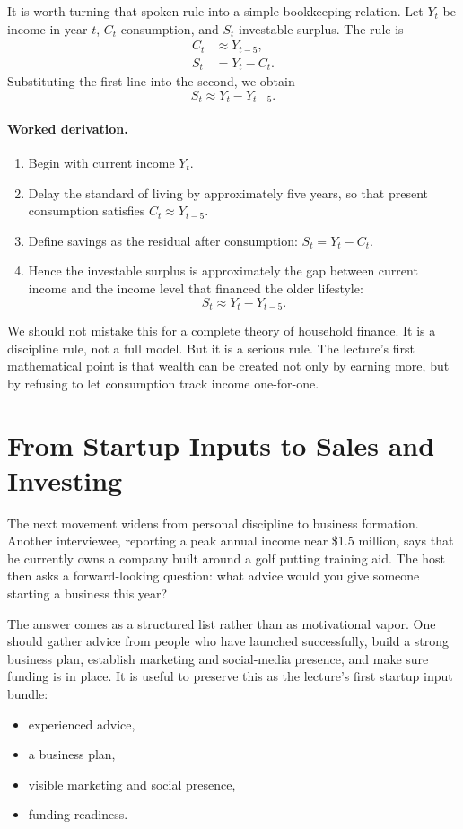 It is worth turning that spoken rule into a simple bookkeeping relation. Let \(Y_t\) be income in year \(t\), \(C_t\) consumption, and \(S_t\) investable surplus. The rule is
\begin{align}
C_t &\approx Y_{t-5}, \\
S_t &= Y_t - C_t.
\end{align}
Substituting the first line into the second, we obtain
\begin{equation}
S_t \approx Y_t - Y_{t-5}.
\end{equation}

\paragraph{Worked derivation.}
\begin{enumerate}
\item Begin with current income \(Y_t\).
\item Delay the standard of living by approximately five years, so that present consumption satisfies \(C_t \approx Y_{t-5}\).
\item Define savings as the residual after consumption: \(S_t = Y_t - C_t\).
\item Hence the investable surplus is approximately the gap between current income and the income level that financed the older lifestyle:
\[
S_t \approx Y_t - Y_{t-5}.
\]
\end{enumerate}

We should not mistake this for a complete theory of household finance. It is a discipline rule, not a full model. But it is a serious rule. The lecture's first mathematical point is that wealth can be created not only by earning more, but by refusing to let consumption track income one-for-one.

\section{From Startup Inputs to Sales and Investing}

The next movement widens from personal discipline to business formation. Another interviewee, reporting a peak annual income near \$1.5 million, says that he currently owns a company built around a golf putting training aid. The host then asks a forward-looking question: what advice would you give someone starting a business this year?

The answer comes as a structured list rather than as motivational vapor. One should gather advice from people who have launched successfully, build a strong business plan, establish marketing and social-media presence, and make sure funding is in place. It is useful to preserve this as the lecture's first startup input bundle:
\begin{itemize}
\item experienced advice,
\item a business plan,
\item visible marketing and social presence,
\item funding readiness.
\end{itemize}

